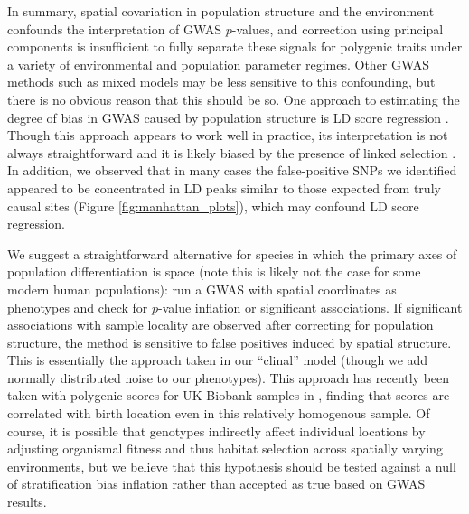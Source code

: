 \documentclass[10pt,twoside,lineno,hidelinks]{preprint}
\begin{document}
In summary, spatial covariation in population structure and the environment confounds the interpretation of GWAS $p$-values, and correction using principal components is insufficient to fully separate these signals for polygenic traits under a variety of environmental and population parameter regimes. 
Other GWAS methods such as mixed models \citep{Kang2008}  may be less sensitive to this confounding, but there is no obvious reason that this should be so. 
One approach to estimating the degree of bias in GWAS caused by population structure is LD score regression \citep{Bulik-Sullivan2015}. 
Though this approach appears to work well in practice, its interpretation is not always straightforward and it is likely biased by the presence of linked selection \citep{Berg2018}. In addition, we observed that in many cases the false-positive SNPs we identified appeared to be concentrated in LD peaks similar to those expected from truly causal sites (Figure \ref{fig:manhattan_plots}), which may confound LD score regression.

We suggest a straightforward alternative for species in which the primary axes of population differentiation is space 
(note this is likely not the case for some modern human populations): 
run a GWAS with spatial coordinates as phenotypes and check for $p$-value inflation or significant associations.
If significant associations with sample locality are observed after correcting for population structure, 
the method is sensitive to false positives induced by spatial structure. This is essentially the approach taken in our ``clinal'' model (though we add normally distributed noise to our phenotypes). This approach has recently been taken with polygenic scores for UK Biobank samples in \cite{haworth2019apparent}, finding that scores are correlated with birth location even in this relatively homogenous sample. 
Of course, it is possible that genotypes indirectly affect individual locations by adjusting organismal fitness and thus habitat selection across spatially varying environments, but we believe that this hypothesis should be tested against a null of stratification bias inflation rather than accepted as true based on GWAS results.  

\end{document}
